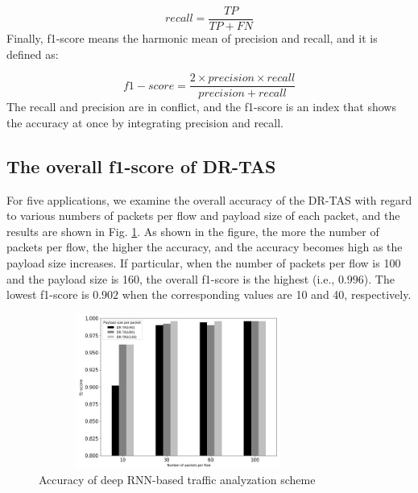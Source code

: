 \documentclass[10pt, twoside, jounal]{IEEEtran}
\begin{document}
\begin{equation}
recall = \frac{TP}{TP + FN}
\end{equation}
Finally, f1-score means the harmonic mean of precision and recall, and it is defined as:

\begin{equation}
f1-score = \frac{2 \times precision \times recall}{precision + recall}
\end{equation}
The recall and precision are in conflict, and the f1-score is an index that shows the accuracy at once by integrating precision and recall.

\subsection{The overall f1-score of DR-TAS}
For five applications, we examine the overall accuracy of the DR-TAS with regard to various numbers of packets per flow and payload size of each packet, and the results are shown in Fig. \ref{fig4}.
As shown in the figure, the more the number of packets per flow, the higher the accuracy, and the accuracy becomes high as the payload size increases.
If particular, when the number of packets per flow is 100 and the payload size is 160, the overall
f1-score is the highest (i.e., $0.996$). The lowest f1-score is $0.902$ when the corresponding values are 10 and 40, respectively.
\begin{figure}[!t]
\centering
\setlength{\abovecaptionskip}{0pt}
\setlength{\belowcaptionskip}{0pt}
{
\includegraphics[width=3.6in, height=2.0in]{fig4.jpg}
\caption{Accuracy of deep RNN-based traffic analyzation scheme}
\label{fig4}
}
\end{figure}
\end{document}
